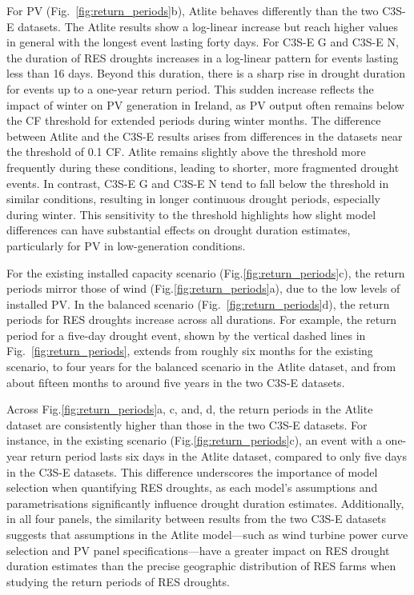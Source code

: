 \documentclass[a4paper, 11pt]{article}
\begin{document}
For PV (Fig.~\ref{fig:return_periods}b), Atlite behaves differently than the two C3S-E datasets. The Atlite results show a log-linear increase but reach higher values in general with the longest event lasting forty days. For C3S-E G and C3S-E N, the duration of RES droughts increases in a log-linear pattern for events lasting less than 16 days. Beyond this duration, there is a sharp rise in drought duration for events up to a one-year return period. This sudden increase reflects the impact of winter on PV generation in Ireland, as PV output often remains below the CF threshold for extended periods during winter months. The difference between Atlite and the C3S-E results arises from differences in the datasets near the threshold of 0.1 CF. Atlite remains slightly above the threshold more frequently during these conditions, leading to shorter, more fragmented drought events. In contrast, C3S-E G and C3S-E N tend to fall below the threshold in similar conditions, resulting in longer continuous drought periods, especially during winter. This sensitivity to the threshold highlights how slight model differences can have substantial effects on drought duration estimates, particularly for PV in low-generation conditions.

For the existing installed capacity scenario (Fig.\ref{fig:return_periods}c), the return periods mirror those of wind (Fig.\ref{fig:return_periods}a), due to the low levels of installed PV. In the balanced scenario (Fig.~\ref{fig:return_periods}d), the return periods for RES droughts increase across all durations. For example, the return period for a five-day drought event, shown by the vertical dashed lines in Fig.~\ref{fig:return_periods}, extends from roughly six months for the existing scenario, to four years for the balanced scenario in the Atlite dataset, and from about fifteen months to around five years in the two C3S-E datasets. %

Across Fig.\ref{fig:return_periods}a, c, and, d, the return periods in the Atlite dataset are consistently higher than those in the two C3S-E datasets. For instance, in the existing scenario (Fig.\ref{fig:return_periods}c), an event with a one-year return period lasts six days in the Atlite dataset, compared to only five days in the C3S-E datasets. This difference underscores the importance of model selection when quantifying RES droughts, as each model’s assumptions and parametrisations significantly influence drought duration estimates. Additionally, in all four panels, the similarity between results from the two C3S-E datasets suggests that assumptions in the Atlite model—such as wind turbine power curve selection and PV panel specifications—have a greater impact on RES drought duration estimates than the precise geographic distribution of RES farms when studying the return periods of RES droughts.
\end{document}

